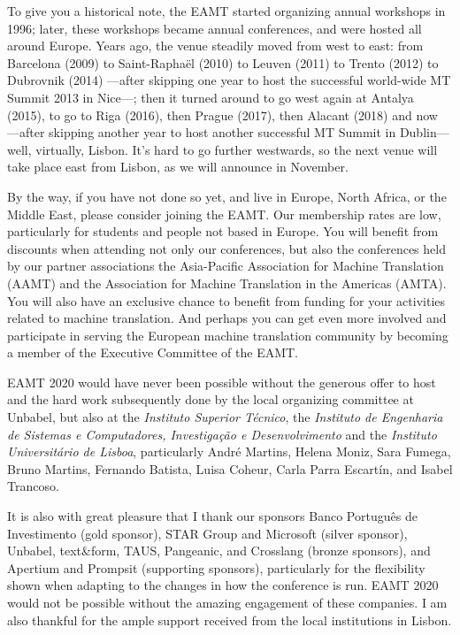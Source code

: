\documentclass[a4paper,11pt,twoside]{book}
\begin{document}
To give you a historical note, the EAMT started organizing annual workshops in 1996; later, these workshops became annual conferences, and were hosted all around Europe. Years ago, the venue steadily moved from west to east: from Barcelona (2009) to Saint-Rapha\"{e}l (2010) to Leuven (2011) to Trento (2012) to Dubrovnik (2014) ---after skipping one year to host the successful world-wide MT Summit 2013 in Nice---; then it turned  around to go west again at Antalya (2015),
to go to Riga (2016), then Prague (2017), then Alacant (2018) and now ---after skipping another year to host another successful MT Summit in Dublin--- well, virtually, Lisbon. It's hard to go further westwards, so the next venue will take place east from Lisbon, as we will announce in November.

By the way, if you have not done so yet, and live in Europe, North Africa, or the Middle East,
please consider joining the EAMT. Our membership rates are low, particularly for students
and people not based in Europe. You will benefit from discounts when attending not only
our conferences, but also the conferences held by our partner associations the Asia-Pacific
Association for Machine Translation (AAMT) and the Association for Machine Translation in
the Americas (AMTA). You will also have an exclusive chance to benefit from funding for your
activities related to machine translation. And perhaps you can get even more involved and
participate in serving the European machine translation community by becoming a member of
the Executive Committee of the EAMT.


EAMT 2020 would have never been possible without the generous offer to host and the
hard work subsequently done by the local organizing committee at Unbabel, but also at the \emph{Instituto Superior Técnico}, the \emph{Instituto de Engenharia de Sistemas e Computadores, Investigação e Desenvolvimento} and the \emph{Instituto Universitário de Lisboa}, particularly André Martins, Helena Moniz, Sara Fumega, Bruno Martins, Fernando Batista, Luisa Coheur, Carla Parra Escartín, and Isabel Trancoso.

It is also with great pleasure that I thank our sponsors Banco Português de Investimento (gold sponsor), STAR Group and Microsoft (silver sponsor), Unbabel, text\&form, TAUS, Pangeanic, and Crosslang (bronze sponsors), and Apertium and Prompsit (supporting sponsors), particularly for the flexibility shown when adapting to the changes in how the conference is run. EAMT 2020 would not be possible without the amazing engagement of these companies. I am also thankful for the ample support received from the local institutions in Lisbon. 
\end{document}
